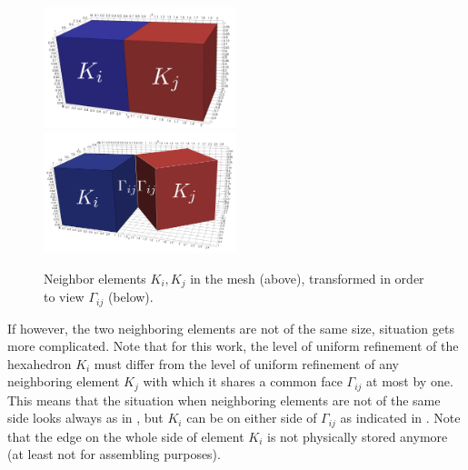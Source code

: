 \begin{figure}[H]
		\begin{center}
			\includegraphics[width=0.5\textwidth]{img/mesh/neighborsK.jpg}
			\vspace{3mm}
			\includegraphics[width=0.5\textwidth]{img/mesh/neighborsSepK.jpg}
			\vspace{-5mm}
		\caption{Neighbor elements $K_i, K_j$ in the mesh (above), transformed in order to view $\Gamma_{ij}$ (below).}
		\label{figure:simpleNeighbors}
		\end{center}
	\end{figure}\vspace{-5mm}
	
If however, the two neighboring elements are not of the same size, situation gets more complicated. Note that for this work, the level of uniform refinement of the hexahedron $K_i$ must differ from the level of uniform refinement of any neighboring element $K_j$ with which it shares a common face $\Gamma_{ij}$ at most by one. This means that the situation when neighboring elements are not of the same side looks always as in , but $K_i$ can be on either side of $\Gamma_{ij}$ as indicated in . Note that the edge on the whole side of element $K_i$ is not physically stored anymore (at least not for assembling purposes).


